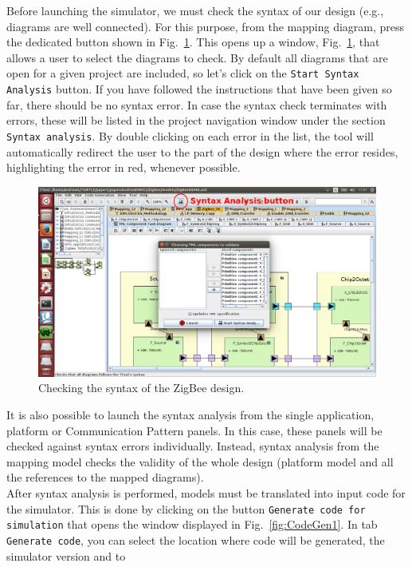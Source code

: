 \documentclass{llncs}
\newcommand{\screenshotsize}{1.0\textwidth}
\begin{document}
\noindent
Before launching the simulator, we must check the syntax of our design (e.g., diagrams are well connected). For this
purpose, from the mapping diagram, press the dedicated button shown in Fig.~\ref{fig:SyntaxAnalysis}. This opens up a
window, Fig.~\ref{fig:SyntaxAnalysis}, that allows a user to select the diagrams to check. By default all diagrams that
are open for a given project are included, so let's click on the \texttt{Start Syntax Analysis} button. If you have
followed the instructions that have been given so far, there should be no syntax error. In case the syntax check
terminates with errors, these will be listed in the project navigation window under the section \texttt{Syntax
analysis}. By double clicking on each error in the list, the tool will automatically redirect the user to the part of
the design where the error resides, highlighting the error in red, whenever possible.\\
%
\begin{figure}[!htbp]
	\centering
	\includegraphics[width=\screenshotsize]{figures/screenshot/SyntaxAnalysis.png}
	\caption{Checking the syntax of the ZigBee design.}
	\label{fig:SyntaxAnalysis}
\end{figure}
%
It is also possible to launch the syntax analysis from the single application, platform or Communication Pattern panels.
In this case, these panels will be checked against syntax errors individually. Instead, syntax analysis from the mapping
model checks the validity of the whole design (platform model and all the references to the mapped diagrams).\\
%
After syntax analysis is performed, models must be translated into input code for the simulator. This is done by
clicking on the button \texttt{Generate code for simulation} that opens the window displayed in Fig.~\ref{fig:CodeGen1}.
In tab \texttt{Generate code}, you can select the location where code will be generated, the simulator version and to
\end{document}
